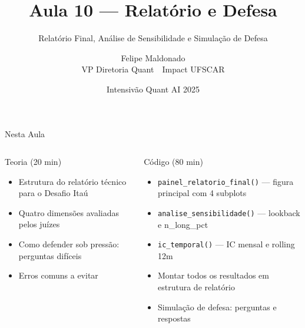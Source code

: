 \documentclass[aspectratio=169,12pt]{beamer}
\author{Felipe Maldonado\\{\scriptsize VP Diretoria Quant~\textbullet{}~Impact UFSCAR}}
\date{Intensivão Quant AI 2025}
\title{Aula 10 --- Relatório e Defesa}
\subtitle{Relatório Final, Análise de Sensibilidade e Simulação de Defesa}
\begin{document}
\begin{frame}[plain]
\titlepage
\end{frame}

\begin{frame}[fragile]{Nesta Aula}
\begin{columns}[T]
\begin{block}{Teoria (20 min)}
\begin{itemize}
  \item Estrutura do relatório técnico para o Desafio Itaú
  \item Quatro dimensões avaliadas pelos juízes
  \item Como defender sob pressão: perguntas difíceis
  \item Erros comuns a evitar
\end{itemize}
\end{block}
\begin{block}{Código (80 min)}
\begin{itemize}
  \item \texttt{painel\_relatorio\_final()} — figura principal com 4 subplots
  \item \texttt{analise\_sensibilidade()} — lookback e n\_long\_pct
  \item \texttt{ic\_temporal()} — IC mensal e rolling 12m
  \item Montar todos os resultados em estrutura de relatório
  \item Simulação de defesa: perguntas e respostas
\end{itemize}
\end{block}
\end{columns}
\end{frame}
\end{document}
